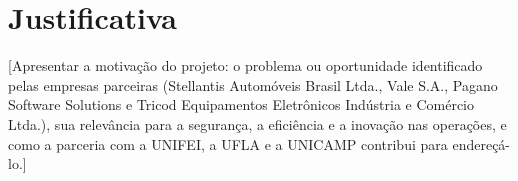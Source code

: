 \chapter{Justificativa}

[Apresentar a motivação do projeto: o problema ou oportunidade identificado pelas empresas parceiras (Stellantis Automóveis Brasil Ltda., Vale S.A., Pagano Software Solutions e Tricod Equipamentos Eletrônicos Indústria e Comércio Ltda.), sua relevância para a segurança, a eficiência e a inovação nas operações, e como a parceria com a UNIFEI, a UFLA e a UNICAMP contribui para endereçá-lo.]
